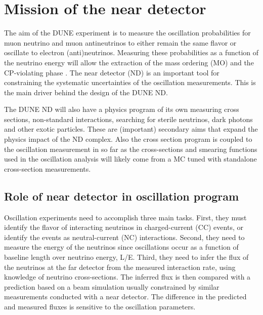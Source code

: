 

\section{Mission of the near detector}
\label{sec:exsum-nd-role}

The aim of the DUNE experiment is to measure the oscillation probabilities for muon neutrino and muon antineutrinos to either remain the same flavor or oscillate to electron (anti)neutrinos. Measuring these probabilities as a function of the neutrino energy will allow the extraction of the mass ordering (MO) and the CP-violating phase \deltacp.  The near detector (ND) is an important tool for constraining the systematic uncertainties of the oscillation measurements. This is the main driver behind the design of the DUNE ND. 

The DUNE ND will also have a physics program of its own measuring cross sections, non-standard interactions, searching for sterile neutrinos, dark photons and other exotic particles. These are (important) secondary aims that expand the physics impact of the ND complex.  Also the cross section program is coupled to the oscillation measurement in so far as the cross-sections and smearing functions used in the oscillation analysis will likely come from a MC tuned with standalone cross-section measurements.

\subsection{Role of near detector in oscillation program}

Oscillation experiments need to accomplish three main tasks. First, they must identify the flavor of interacting neutrinos in charged-current (CC) events, or identify the events as neutral-current (NC) interactions. Second, they need to measure the energy of the neutrinos since oscillations occur as a function of baseline length over neutrino energy, L/E. Third, they need to infer the flux of the neutrinos at the far detector from the measured interaction rate, using knowledge of neutrino cross-sections. The inferred flux is then compared with a prediction based on a beam simulation usually constrained by similar measurements conducted with a near detector. The difference in the predicted and measured fluxes is sensitive to the oscillation parameters.

